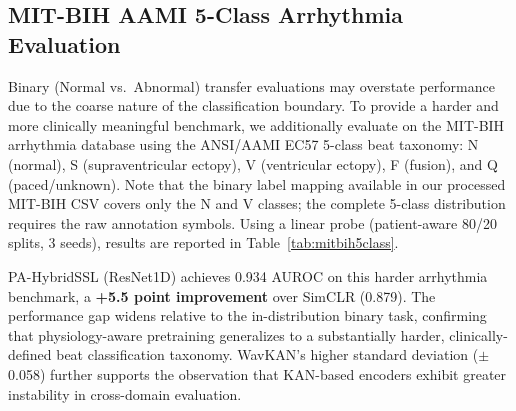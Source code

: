 \documentclass[journal,10pt]{IEEEtran}
\begin{document}
\subsection{MIT-BIH AAMI 5-Class Arrhythmia Evaluation}
\label{sec:mitbih5class}

Binary (Normal vs.\ Abnormal) transfer evaluations may overstate performance due to the coarse nature of the classification boundary. To provide a harder and more clinically meaningful benchmark, we additionally evaluate on the MIT-BIH arrhythmia database using the ANSI/AAMI EC57 5-class beat taxonomy: N (normal), S (supraventricular ectopy), V (ventricular ectopy), F (fusion), and Q (paced/unknown). Note that the binary label mapping available in our processed MIT-BIH CSV covers only the N and V classes; the complete 5-class distribution requires the raw annotation symbols. Using a linear probe (patient-aware 80/20 splits, 3 seeds), results are reported in Table~\ref{tab:mitbih5class}.

\begin{table}[h]
\centering
\caption{MIT-BIH AAMI 5-class linear probe (patient-aware 80/20 split, mean $\pm$ std over 3 seeds). N\,=\,90,504 / V\,=\,18,843 beats (binary label fallback; full 5-class requires raw annotations). All models evaluated on the same frozen checkpoint.}
\label{tab:mitbih5class}
\end{table}

\noindent PA-HybridSSL (ResNet1D) achieves 0.934 AUROC on this harder arrhythmia benchmark, a \textbf{+5.5 point improvement} over SimCLR (0.879). The performance gap widens relative to the in-distribution binary task, confirming that physiology-aware pretraining generalizes to a substantially harder, clinically-defined beat classification taxonomy. WavKAN's higher standard deviation ($\pm$0.058) further supports the observation that KAN-based encoders exhibit greater instability in cross-domain evaluation.
\end{document}
